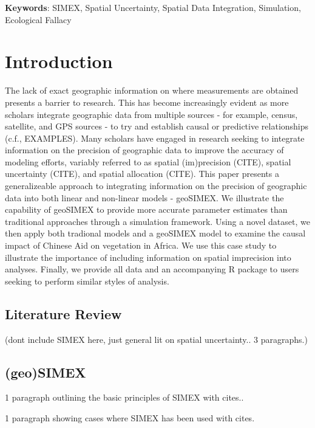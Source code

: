 \documentclass[11pt]{article}
\begin{document}
\textbf{Keywords}: SIMEX, Spatial Uncertainty, Spatial Data Integration, Simulation, Ecological Fallacy\\
\newpage

\section{Introduction}
The lack of exact geographic information on where measurements are obtained presents a barrier to research.
This has become increasingly evident as more scholars integrate geographic data from multiple sources - for example, census, satellite, and GPS sources - to try and establish causal or predictive relationships (c.f., EXAMPLES).
Many scholars have engaged in research seeking to integrate information on the precision of geographic data to improve the accuracy of modeling efforts, variably referred to as spatial (im)precision (CITE), spatial uncertainty (CITE), and spatial allocation (CITE).
This paper presents a generalizeable approach to integrating information on the precision of geographic data into both linear and non-linear models - geoSIMEX.
We illustrate the capability of geoSIMEX to provide more accurate parameter estimates than traditional approaches through a simulation framework. 
Using a novel dataset, we then apply both tradional models and a geoSIMEX model to examine the causal impact of Chinese Aid on vegetation in Africa.
We use this case study to illustrate the importance of including information on spatial imprecision into analyses.
Finally, we provide all data and an accompanying R package to users seeking to perform similar styles of analysis.

\subsection{Literature Review}
(dont include SIMEX here, just general lit on spatial uncertainty..  3 paragraphs.)


\subsection{(geo)SIMEX}
1 paragraph outlining the basic principles of SIMEX with cites..

1 paragraph showing cases where SIMEX has been used with cites.
\end{document}
